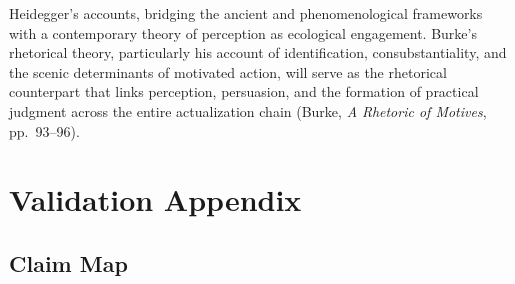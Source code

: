 \documentclass[12pt]{article}
\begin{document}
Heidegger's accounts, bridging the ancient and phenomenological frameworks with a contemporary theory of perception as ecological engagement. Burke's rhetorical theory, particularly his account of identification, consubstantiality, and the scenic determinants of motivated action, will serve as the rhetorical counterpart that links perception, persuasion, and the formation of practical judgment across the entire actualization chain (Burke, \textit{A Rhetoric of Motives}, pp.~93--96).

\section*{Validation Appendix}

\subsection*{Claim Map}
\end{document}
